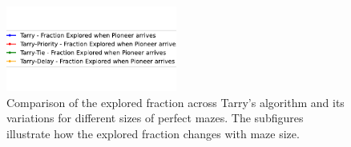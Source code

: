 \begin{figure}[H]
    \centering
    \qquad
    \qquad
    \includegraphics[width=0.5\textwidth]{Cap3/tarry_var_fraction_legend.pdf}
    \newline
    \qquad
    \newline
    \qquad
    \caption{Comparison of the explored fraction across Tarry's algorithm and its variations for different sizes of perfect mazes. The subfigures illustrate how the explored fraction changes with maze size.}
    \label{fig_tarry_fraction_all_sizes_maze}
\end{figure}
 
